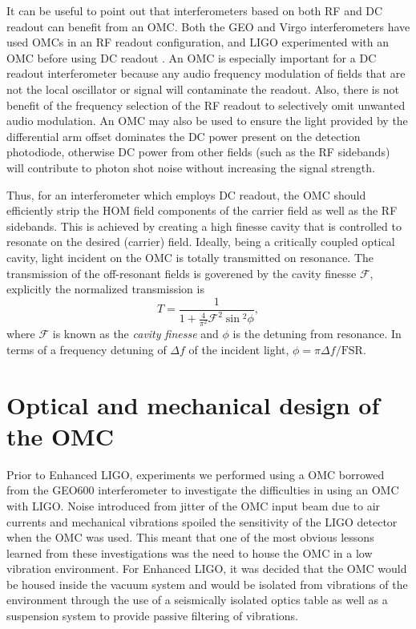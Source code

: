 It can be useful to point out that interferometers based on both RF and DC readout can benefit from an OMC. %
Both the GEO and Virgo interferometers have used OMCs in an RF readout configuration, and LIGO experimented with an OMC before using DC readout \cite{G040326}. %
An OMC is especially important for a DC readout interferometer because any audio frequency modulation of fields that are not the local oscillator or signal will contaminate the readout. %
Also, there is not benefit of the frequency selection of the RF readout to selectively omit unwanted audio modulation. %
An OMC may also be used to ensure the light provided by the differential arm offset dominates the DC power present on the detection photodiode, otherwise DC power from other fields (such as the RF sidebands) will contribute to photon shot noise without increasing the signal strength. %


Thus, for an interferometer which employs DC readout, the OMC should efficiently strip the HOM field components of the carrier field as well as the RF sidebands. %
This is achieved by creating a high finesse cavity that is controlled to resonate on the desired (carrier) field. %
Ideally, being a critically coupled optical cavity, light incident on the OMC is totally transmitted on resonance. %
The transmission of the off-resonant fields is goverened by the cavity finesse $\mathcal{F}$, explicitly the normalized transmission is
\begin{equation}
\label{eqn:finesse}
T=\frac{1}{1+\frac{4}{\pi^2}\mathcal{F}^2\sin{}^2\phi},
\end{equation}
where $\mathcal{F}$ is known as the \emph{cavity finesse} and $\phi$ is the detuning from resonance. %
In terms of a frequency detuning of $\Delta f$ of the incident light, $\phi = \pi \Delta f / \mathrm{FSR}$.

\section{Optical and mechanical design of the OMC}
Prior to Enhanced LIGO, experiments we performed using a OMC borrowed from the GEO600 interferometer to investigate the difficulties in using an OMC with LIGO. %
Noise introduced from jitter of the OMC input beam due to air currents and mechanical vibrations spoiled the sensitivity of the LIGO detector when the OMC was used. %
This meant that one of the most obvious lessons learned from these investigations was the need to house the OMC in a low vibration environment. %
For Enhanced LIGO, it was decided that the OMC would be housed inside the vacuum system and would be isolated from vibrations of the environment through the use of a seismically isolated optics table as well as a suspension system to provide passive filtering of vibrations.

